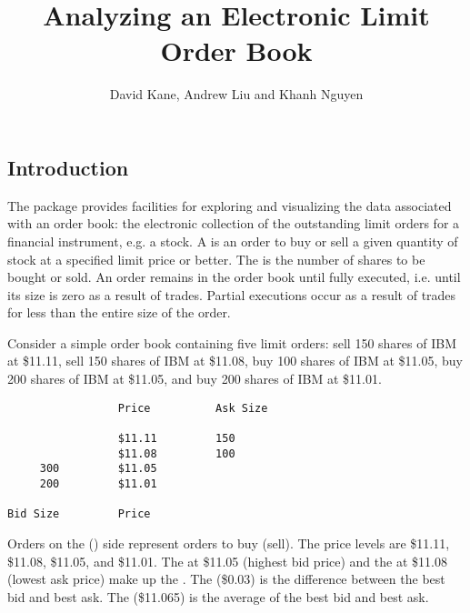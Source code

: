\documentclass[a4paper]{report}
\begin{document}
\begin{article}

\title{Analyzing an Electronic Limit Order Book}
\author{David Kane, Andrew Liu and Khanh Nguyen}



\maketitle



\section{Introduction}

The  package provides facilities for exploring and
visualizing the data associated with an order book: the electronic
collection of the outstanding limit orders for a financial instrument,
e.g. a stock. A  is an order to buy or sell a given
quantity of stock at a specified limit price or better. The
 is the number of shares to be bought or sold.  An order
remains in the order book until fully executed, i.e. until its size is
zero as a result of trades. Partial executions occur as a result of
trades for less than the entire size of the order.

Consider a simple order book containing five limit orders: sell 150
shares of IBM at \$11.11, sell 150 shares of IBM at \$11.08, buy 100
shares of IBM at \$11.05, buy 200 shares of IBM at \$11.05, and buy
200 shares of IBM at \$11.01.

\begin{verbatim}
                 Price          Ask Size

                 $11.11         150
                 $11.08         100
     300         $11.05
     200         $11.01

Bid Size         Price
\end{verbatim}

\noindent Orders on the  () side represent orders to buy
(sell). The price levels are \$11.11, \$11.08, \$11.05, and
\$11.01. The  at \$11.05 (highest bid price) and the
 at \$11.08 (lowest ask price) make up the . The  (\$0.03) is the difference between the
best bid and best ask. The  (\$11.065) is the average
of the best bid and best ask.


\end{article}
\end{document}
